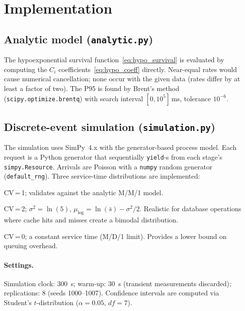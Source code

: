 \documentclass[12pt,a4paper]{article}
\begin{document}
\section{Implementation}
\label{sec:implementation}

\subsection{Analytic model ({\small\texttt{analytic.py}})}

The hypoexponential survival function~\eqref{eq:hypo_survival} is evaluated by computing
the $C_i$ coefficients~\eqref{eq:hypo_coeff} directly. Near-equal rates would cause
numerical cancellation; none occur with the given data (rates differ by at least a factor
of two). The P95 is found by Brent's method (\texttt{scipy.optimize.brentq}) with search
interval $[0, 10^5]$\,ms, tolerance $10^{-6}$.

\subsection{Discrete-event simulation ({\small\texttt{simulation.py}})}

The simulation uses SimPy~4.x with the generator-based process model. Each request is a
Python generator that sequentially \texttt{yield}-s from each stage's \texttt{simpy.Resource}.
Arrivals are Poisson with a \texttt{numpy} random generator (\texttt{default\_rng}). Three
service-time distributions are implemented:

\begin{description}[leftmargin=2.5cm]
  \item[Exponential] CV\,=\,1; validates against the analytic M/M/1 model.
  \item[Lognormal]   CV\,=\,2; $\sigma^2 = \ln(5)$, $\mu_{\log} = \ln(\bar{s}) - \sigma^2/2$.
                     Realistic for database operations where cache hits and misses create
                     a bimodal distribution.
  \item[Deterministic] CV\,=\,0; a constant service time (M/D/1 limit). Provides a lower
                     bound on queuing overhead.
\end{description}

\paragraph{Settings.} Simulation clock: \SI{300}{s}; warm-up: \SI{30}{s} (transient
measurements discarded); replications: 8 (seeds 1000--1007). Confidence intervals are
computed via Student's $t$-distribution ($\alpha = 0.05$, $df = 7$).
\end{document}
